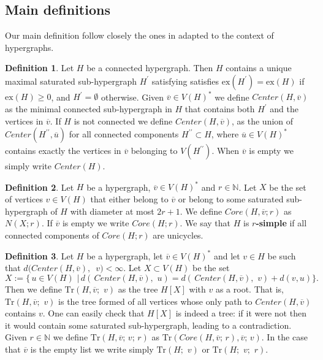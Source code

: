\documentclass[12pt,notitlepage,a4paper]{article}
\theoremstyle{definition}
\newtheorem{definition}{Definition}[section]
\newcommand{\N}{\mathbb{N}}
\newcommand{\Tr}{\mathrm{Tr}}
\newcommand{\ex}{\mathrm{ex}}
\begin{document}
\subsection{Main definitions}

Our main definition follow closely the ones in \cite{lynch1992probabilities}
adapted to the context of hypergraphs. 

\begin{definition} 
Let $H$ be a connected hypergraph. Then
$H$ contains a unique maximal saturated sub-hypergraph $H^\prime$
satisfying satisfies $\ex(H^\prime)=\ex(H)$ if $\ex(H)\geq 0$, and $H^\prime=\emptyset$ 
otherwise. Given
$\overline{v}\in V(H)^*$ we define $Center(H,\overline{v})$ as the 
minimal connected sub-hypergraph in $H$ that contains both $H^\prime$
and the vertices in $\overline{v}$. 
If $H$ is not connected 
we define $Center(H,\overline{v})$,
as the union of $Center(H^{\prime\prime},\overline{u})$
for all connected components $H^{\prime\prime} \subset H$,
where $\overline{u}\in V(H)^*$ contains exactly the vertices
in $\overline{v}$ belonging to $V(H^{\prime\prime})$. When $\overline{v}$
is empty we simply write $Center(H)$.
\end{definition}

\begin{definition}
Let $H$ be a hypergraph, $\overline{v}\in V(H)^*$
and $r\in \N$. Let $X$ be the set of vertices $v\in V(H)$
that either belong to $\overline{v}$ or belong 
to some saturated sub-hypergraph of $H$ with
diameter at most $2r+1$. 
We define $Core(H, \overline{v};r)$ as $N(X;r)$. If
$\overline{v}$ is empty we write $Core(H;r)$.
We say that $H$ is \textbf{$r$-simple} if all connected components of 
$Core(H;r)$ are unicycles. 	
\end{definition}



\begin{definition}\label{def:TrOperator}
	Let $H$ be a hypergraph, let $\overline{v}\in V(H)^*$ and 
	let $v\in H$ be such that $d(Center(H,\overline{v}),$ $ \, v)<\infty$. 
	Let $X\subset V(H)$ be the set
	\[
	X:=\big\{\, u\in V(H) \,\, \big| \, 
	d\left(\, Center(H, \overline{v})
	, \, \, u \right)= d\left(\, Center(H, \overline{v})
	, \, \, v \right) + d(v,u)
	\big\}.
	\]
	Then we define $\mathrm{Tr}\left(
	H,\overline{v};\,\, v\right)$ as the tree $H[X]$ 		
	with $v$ as a root. That is,
	$\mathrm{Tr}\left(
	H,\overline{v};\,\, v\right)$ is the tree formed of all 
	vertices whose only path to $Center(H,\overline{v})$ 
	contains $v$. One can easily check that $H[X]$ is indeed a tree:
	if it were not then it would contain some saturated sub-hypergraph, leading
	to a contradiction. 
	Given $r\in \N$ we define $\mathrm{Tr}(H,\overline{v};\, v;\, r)$ as
	$\mathrm{Tr}( Core(H,\overline{v};\,r),\overline{v}; \, v)$.
	In the case that $\overline{v}$ is the empty list we write
	simply $\mathrm{Tr}(H;\,\, v)$ or $\Tr(H;\,\,v;\,\,r)$.
\end{definition}
\end{document}
